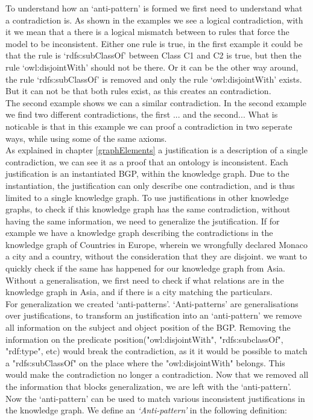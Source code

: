 \documentclass{article}
\begin{document}
 To understand how an `anti-pattern' is formed we first need to understand what a contradiction is. As shown in the examples we see a logical contradiction, with it we mean that a there is a logical mismatch between to rules that force the model to be inconsistent. Either one rule is true, in the first example it could be that the rule is `rdfs:subClassOf' between Class C1 and C2 is true, but then the rule `owl:disjointWith' should not be there. Or it can be the other way around, the rule `rdfs:subClassOf' is removed and only the rule `owl:disjointWith' exists. But it can not be that both rules exist, as this creates an contradiction. \\
 
 The second example shows we can a similar contradiction. In the second example we find two different contradictions, the first ... and the second... What is noticable is that in this example we can proof a contradiction in two seperate ways, while using some of the same axioms. \\
 
 As explained in chapter \ref{graphElements} a justification is a description of a single contradiction, we can see it as a proof that an ontology is inconsistent. Each justification is an instantiated BGP, within the knowledge graph. Due to the instantiation, the justification can only describe one contradiction, and is thus limited to a single knowledge graph. To use justifications in other knowledge graphs, to check if this knowledge graph has the same contradiction, without having the same information, we need to generalize the jsutification. If for example we have a knowledge graph describing the contradictions in the knowledge graph of Countries in Europe, wherein we wrongfully declared Monaco a city and a country, without the consideration that they are disjoint. we want to quickly check if the same has happened for our knowledge graph from Asia. Without a generalisation, we first need to check if what relations are in the knowledge graph in Asia, and if there is a city matching the particulars.\\
 
 For generalization we created `anti-patterns'. `Anti-patterns' are generalisations over justifications, to transform an justification into an `anti-pattern' we remove all information on the subject and object position of the BGP. Removing the information on the predicate position("owl:disjointWith", "rdfs:subclassOf", "rdf:type", etc) would break the contradiction, as it it would be possible to match a "rdfs:subClassOf" on the place where the "owl:disjointWith" belongs. This would make the contradiction no longer a contradiction.  
 Now that we removed all the information that blocks generalization, we are left with the `anti-pattern'. Now the `anti-pattern' can be used to match various inconsistent justifications in the knowledge graph. We define an \textit{`Anti-pattern'} in the following definition:\\
\end{document}
